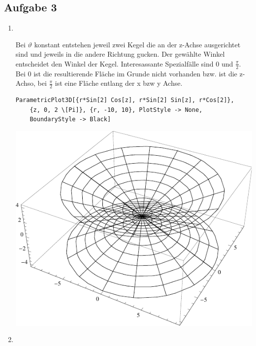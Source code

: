 \documentclass[10pt,a4paper,parskip=half]{scrartcl}
\begin{document}
\subsection*{Aufgabe 3}
\begin{enumerate}[$\quad$]
	\item \ \\ 
	\begin{minipage}{0.50\columnwidth}
	Bei $\vartheta$ konstant entstehen jeweil zwei Kegel die an der z-Achse ausgerichtet sind und jeweils in die andere Richtung gucken. Der gewählte Winkel entscheidet den Winkel der Kegel. Interesassante Spezialfälle sind 0 und $\frac{\pi}{2}$. Bei 0 ist die resultierende Fläche im Grunde nicht vorhanden bzw. ist die z-Achso, bei $\frac{\pi}{2}$ ist eine Fläche entlang der x bzw y Achse.
	\begin{lstlisting}[caption= Mathematica Code für den Graph von f]
	ParametricPlot3D[{r*Sin[2] Cos[z], r*Sin[2] Sin[z], r*Cos[2]}, 
	{z, 0, 2 \[Pi]}, {r, -10, 10}, PlotStyle -> None, 
	BoundaryStyle -> Black]
	\end{lstlisting}
	\end{minipage}
	\begin{minipage}{0.50\columnwidth}
	\begin{center}
	\includegraphics[scale=0.7]{thetakonstant.pdf} 
	\end{center}
	\end{minipage}
	\item \ \\
	\begin{minipage}{0.50\columnwidth}

\end{minipage}
\end{enumerate}
\end{document}
